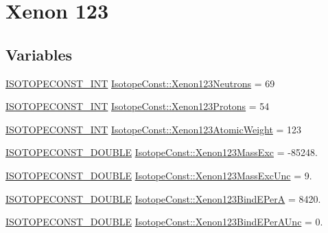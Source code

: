 \hypertarget{group___isotope_const-_xenon-_xe123}{}\section{Xenon 123}
\label{group___isotope_const-_xenon-_xe123}
\subsection*{Variables}
\begin{DoxyCompactItemize}
\item 
\mbox{\hyperlink{group___isotope_const-_macros_ga5f18360b3e99483a35c32d789e62621c}{I\+S\+O\+T\+O\+P\+E\+C\+O\+N\+S\+T\+\_\+\+I\+NT}} \mbox{\hyperlink{group___isotope_const-_xenon-_xe123_gab631a0a86953da729d999cdcead2d93b}{Isotope\+Const\+::\+Xenon123\+Neutrons}} = 69
\item 
\mbox{\hyperlink{group___isotope_const-_macros_ga5f18360b3e99483a35c32d789e62621c}{I\+S\+O\+T\+O\+P\+E\+C\+O\+N\+S\+T\+\_\+\+I\+NT}} \mbox{\hyperlink{group___isotope_const-_xenon-_xe123_ga771385ab056d3fb3c7a67051a9ec1f5e}{Isotope\+Const\+::\+Xenon123\+Protons}} = 54
\item 
\mbox{\hyperlink{group___isotope_const-_macros_ga5f18360b3e99483a35c32d789e62621c}{I\+S\+O\+T\+O\+P\+E\+C\+O\+N\+S\+T\+\_\+\+I\+NT}} \mbox{\hyperlink{group___isotope_const-_xenon-_xe123_ga230723dfaea90cbfc9db8bc2efbee949}{Isotope\+Const\+::\+Xenon123\+Atomic\+Weight}} = 123
\item 
\mbox{\hyperlink{group___isotope_const-_macros_ga8f45a7272ce02c0b4c65c44636ed719a}{I\+S\+O\+T\+O\+P\+E\+C\+O\+N\+S\+T\+\_\+\+D\+O\+U\+B\+LE}} \mbox{\hyperlink{group___isotope_const-_xenon-_xe123_gae159136ff86aca7b381b89e075a0ce33}{Isotope\+Const\+::\+Xenon123\+Mass\+Exc}} = -\/85248.
\item 
\mbox{\hyperlink{group___isotope_const-_macros_ga8f45a7272ce02c0b4c65c44636ed719a}{I\+S\+O\+T\+O\+P\+E\+C\+O\+N\+S\+T\+\_\+\+D\+O\+U\+B\+LE}} \mbox{\hyperlink{group___isotope_const-_xenon-_xe123_ga1953968ab0df2d8c940d7ae461ac83ba}{Isotope\+Const\+::\+Xenon123\+Mass\+Exc\+Unc}} = 9.
\item 
\mbox{\hyperlink{group___isotope_const-_macros_ga8f45a7272ce02c0b4c65c44636ed719a}{I\+S\+O\+T\+O\+P\+E\+C\+O\+N\+S\+T\+\_\+\+D\+O\+U\+B\+LE}} \mbox{\hyperlink{group___isotope_const-_xenon-_xe123_gaed9208d9ffc5a50a7cf2527b0910eed9}{Isotope\+Const\+::\+Xenon123\+Bind\+E\+PerA}} = 8420.
\item 
\mbox{\hyperlink{group___isotope_const-_macros_ga8f45a7272ce02c0b4c65c44636ed719a}{I\+S\+O\+T\+O\+P\+E\+C\+O\+N\+S\+T\+\_\+\+D\+O\+U\+B\+LE}} \mbox{\hyperlink{group___isotope_const-_xenon-_xe123_ga5f1eeaec7e76a6b6cc3cfed240f4936e}{Isotope\+Const\+::\+Xenon123\+Bind\+E\+Per\+A\+Unc}} = 0.

\end{DoxyCompactItemize}
